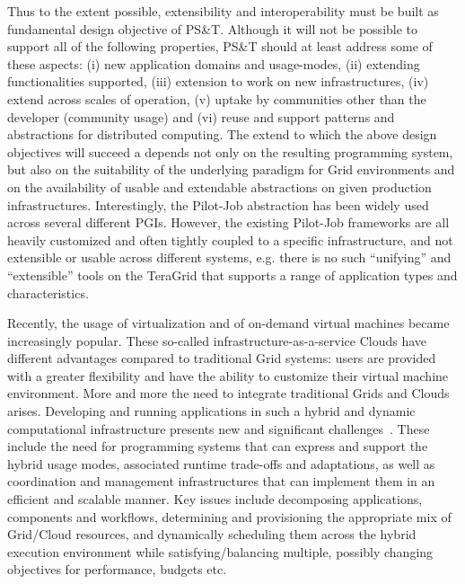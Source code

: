 \documentclass[conference,final]{IEEEtran}
\newcommand{\alnote}[1]{ {\textcolor{blue} { ***AL: #1 }}}
\newcommand{\alnote}[1]{}
\begin{document}

Thus to the extent possible, extensibility and interoperability must
be built as fundamental design objective of PS\&T.  %
Although it will not be possible to support all of the following
properties, PS\&T should at least address some of these aspects: (i)
new application domains and usage-modes, (ii) extending
functionalities supported, (iii) extension to work on new
infrastructures, (iv) extend across scales of operation, (v) uptake by
communities other than the developer (community usage) and (vi) reuse
and support patterns and abstractions for distributed computing.  The
extend to which the above design objectives will succeed a depends not
only on the resulting programming system, but also on the suitability
of the underlying paradigm for Grid environments and on the
availability of usable and extendable abstractions on given production
infrastructures.  Interestingly, the Pilot-Job abstraction has been
widely used across several different PGIs.  However, the existing
Pilot-Job frameworks are all heavily customized and often tightly
coupled to a specific infrastructure, and not extensible or usable
across different systems, e.g. there is no such ``unifying'' and
``extensible'' tools on the TeraGrid that supports a range of
application types and characteristics.

Recently, the usage of virtualization and of on-demand
virtual machines became increasingly popular. These so-called
infrastructure-as-a-service Clouds have different advantages compared
to traditional Grid systems: users are provided with a greater
flexibility and have the ability to customize their virtual machine
environment. 
More and more the need to integrate traditional Grids and
Clouds arises.  Developing and running applications in such a hybrid
and dynamic computational infrastructure presents new and significant
challenges~\cite{cloud-grid-autonomics}. These include the need for
programming systems that can express and support the hybrid usage
modes, associated runtime trade-offs and adaptations, as well as
coordination and management infrastructures that can implement them in
an efficient and scalable manner. Key issues include decomposing
applications, components and workflows, determining and provisioning
the appropriate mix of Grid/Cloud resources, and dynamically
scheduling them across the hybrid execution environment while
satisfying/balancing multiple, possibly changing objectives for
performance, budgets etc.
\end{document}
